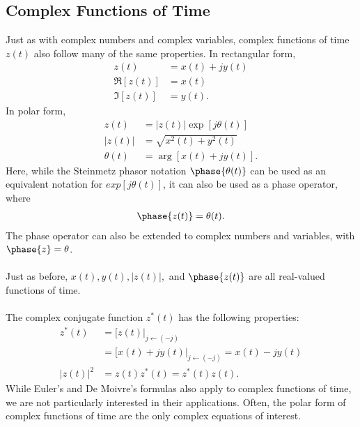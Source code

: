 \documentclass{report}
\begin{document}
\subsection*{Complex Functions of Time}
Just as with complex numbers and complex variables, complex functions of time $z(t)$ also follow many of the same properties. In rectangular form,
\begin{align}
    z(t)&=x(t)+jy(t) \\
    \Re[z(t)] &= x(t) \\
    \Im[z(t)] &= y(t).
\end{align}
In polar form,
\begin{align}
    z(t)&=|z(t)|\exp[{j\theta(t)}] \\
    |z(t)| &= \sqrt{x^2(t)+y^2(t)} \\
    \theta(t) &= \arg[x(t)+jy(t)].
\end{align}
Here, while the Steinmetz phasor notation $\phase{\theta(t)}$ can be used as an equivalent notation for $exp[{j\theta(t)}]$, it can also be used as 
a phase operator, where
\begin{align}
    \phase{z(t)} = \theta(t).
\end{align}
The phase operator can also be extended to complex numbers and variables, with $\phase{z}=\theta$.
\\ \\
Just as before, $x(t),y(t),|z(t)|,$ and $\phase{z(t)}$ are all real-valued functions of time. 
\\ \\
The complex conjugate function $z^*(t)$ has the following properties:
\begin{align}
    z^*(t) &= [z(t)|_{j\leftarrow (-j)} \\
    &= [x(t)+jy(t)|_{j\leftarrow (-j)} = x(t) - jy(t) \\
    |z(t)|^2 &= z(t)z^*(t) = z^*(t)z(t).
\end{align}
While Euler's and De Moivre's formulas also apply to complex functions of time, we are not particularly interested in their applications. 
Often, the polar form of complex functions of time are the only complex equations of interest. 
\end{document}
